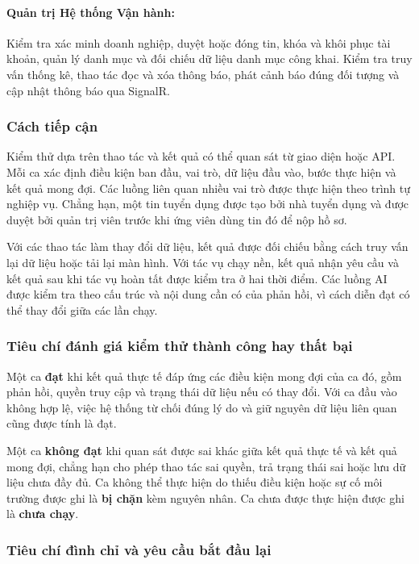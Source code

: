 \paragraph{Quản trị Hệ thống Vận hành:}
Kiểm tra xác minh doanh nghiệp, duyệt hoặc đóng tin, khóa và khôi phục tài khoản, quản lý danh mục và đối chiếu dữ liệu danh mục công khai. Kiểm tra truy vấn thống kê, thao tác đọc và xóa thông báo, phát cảnh báo đúng đối tượng và cập nhật thông báo qua SignalR.

\subsubsection{Cách tiếp cận}

Kiểm thử dựa trên thao tác và kết quả có thể quan sát từ giao diện hoặc API. Mỗi ca xác định điều kiện ban đầu, vai trò, dữ liệu đầu vào, bước thực hiện và kết quả mong đợi. Các luồng liên quan nhiều vai trò được thực hiện theo trình tự nghiệp vụ. Chẳng hạn, một tin tuyển dụng được tạo bởi nhà tuyển dụng và được duyệt bởi quản trị viên trước khi ứng viên dùng tin đó để nộp hồ sơ.

Với các thao tác làm thay đổi dữ liệu, kết quả được đối chiếu bằng cách truy vấn lại dữ liệu hoặc tải lại màn hình. Với tác vụ chạy nền, kết quả nhận yêu cầu và kết quả sau khi tác vụ hoàn tất được kiểm tra ở hai thời điểm. Các luồng AI được kiểm tra theo cấu trúc và nội dung cần có của phản hồi, vì cách diễn đạt có thể thay đổi giữa các lần chạy.

\subsubsection{Tiêu chí đánh giá kiểm thử thành công hay thất bại}

Một ca \textbf{đạt} khi kết quả thực tế đáp ứng các điều kiện mong đợi của ca đó, gồm phản hồi, quyền truy cập và trạng thái dữ liệu nếu có thay đổi. Với ca đầu vào không hợp lệ, việc hệ thống từ chối đúng lý do và giữ nguyên dữ liệu liên quan cũng được tính là đạt.

Một ca \textbf{không đạt} khi quan sát được sai khác giữa kết quả thực tế và kết quả mong đợi, chẳng hạn cho phép thao tác sai quyền, trả trạng thái sai hoặc lưu dữ liệu chưa đầy đủ. Ca không thể thực hiện do thiếu điều kiện hoặc sự cố môi trường được ghi là \textbf{bị chặn} kèm nguyên nhân. Ca chưa được thực hiện được ghi là \textbf{chưa chạy}.

\subsubsection{Tiêu chí đình chỉ và yêu cầu bắt đầu lại}

